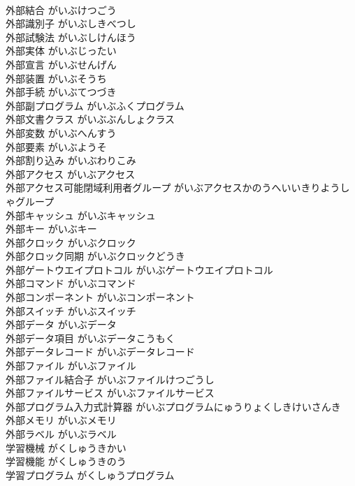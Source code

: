 \documentclass[8pt]{extreport}
\begin{document}
\begin{CJK}{UTF8}{min}
\\	外部結合	がいぶけつごう	
\\	外部識別子	がいぶしきべつし	
\\	外部試験法	がいぶしけんほう	
\\	外部実体	がいぶじったい	
\\	外部宣言	がいぶせんげん	
\\	外部装置	がいぶそうち	
\\	外部手続	がいぶてつづき	
\\	外部副プログラム	がいぶふくプログラム	
\\	外部文書クラス	がいぶぶんしょクラス	
\\	外部変数	がいぶへんすう	
\\	外部要素	がいぶようそ	
\\	外部割り込み	がいぶわりこみ	
\\	外部アクセス	がいぶアクセス	
\\	外部アクセス可能閉域利用者グループ	がいぶアクセスかのうへいいきりようしゃグループ	
\\	外部キャッシュ	がいぶキャッシュ	
\\	外部キー	がいぶキー	
\\	外部クロック	がいぶクロック	
\\	外部クロック同期	がいぶクロックどうき	
\\	外部ゲートウエイプロトコル	がいぶゲートウエイプロトコル	
\\	外部コマンド	がいぶコマンド	
\\	外部コンポーネント	がいぶコンポーネント	
\\	外部スイッチ	がいぶスイッチ	
\\	外部データ	がいぶデータ	
\\	外部データ項目	がいぶデータこうもく	
\\	外部データレコード	がいぶデータレコード	
\\	外部ファイル	がいぶファイル	
\\	外部ファイル結合子	がいぶファイルけつごうし	
\\	外部ファイルサービス	がいぶファイルサービス	
\\	外部プログラム入力式計算器	がいぶプログラムにゅうりょくしきけいさんき	
\\	外部メモリ	がいぶメモリ	
\\	外部ラベル	がいぶラベル	
\\	学習機械	がくしゅうきかい	
\\	学習機能	がくしゅうきのう	
\\	学習プログラム	がくしゅうプログラム	

\end{CJK}
\end{document}
